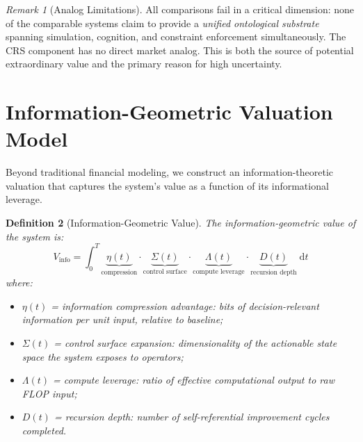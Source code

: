 \documentclass[11pt,a4paper]{article}
\newtheorem{definition}{Definition}[section]
\theoremstyle{remark}
\newtheorem{remark}[definition]{Remark}
\newcommand{\interpretive}[1]{\textcolor{blue!70!black}{#1}}
\begin{document}
\begin{remark}[Analog Limitations]
\label{rem:analog_limits}
All comparisons fail in a critical dimension: none of the comparable
systems claim to provide a \emph{unified ontological substrate}
spanning simulation, cognition, and constraint enforcement
simultaneously.  The CRS component has no direct market analog.
This is both the source of potential extraordinary value and the
primary reason for high uncertainty.
\end{remark}


\section{Information-Geometric Valuation Model}
\label{sec:info_geometric}

\interpretive{Beyond traditional financial modeling, we construct an
information-theoretic valuation that captures the system's value
as a function of its informational leverage.}

\begin{definition}[Information-Geometric Value]
\label{def:info_value}
The information-geometric value of the system is:
\begin{equation}
  V_{\mathrm{info}}
  = \int_0^T
    \underbrace{\eta(t)}_{\text{compression}}
    \cdot
    \underbrace{\Sigma(t)}_{\text{control surface}}
    \cdot
    \underbrace{\Lambda(t)}_{\text{compute leverage}}
    \cdot
    \underbrace{D(t)}_{\text{recursion depth}}
    \;\mathrm{d}t
  \label{eq:info_value}
\end{equation}
where:
\begin{itemize}[nosep]
  \item $\eta(t)$ = information compression advantage: bits of
        decision-relevant information per unit input, relative to
        baseline;
  \item $\Sigma(t)$ = control surface expansion: dimensionality of
        the actionable state space the system exposes to operators;
  \item $\Lambda(t)$ = compute leverage: ratio of effective
        computational output to raw FLOP input;
  \item $D(t)$ = recursion depth: number of self-referential
        improvement cycles completed.
\end{itemize}
\end{definition}
\end{document}
